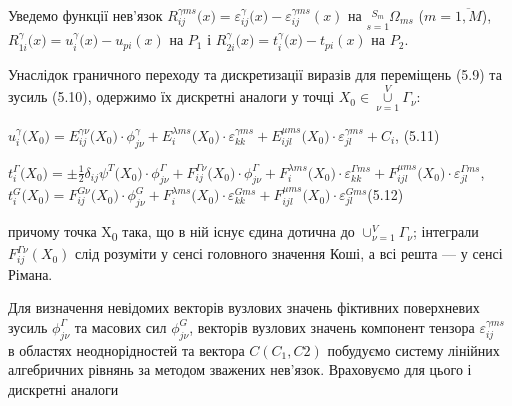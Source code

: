 Уведемо функції нев'язок
$R_{\mathit{\text{ij}}}^{\gamma\mathit{\text{ms}}}(x{) = \varepsilon_{\mathit{\text{ij}}}^{\gamma}}(x{) - \varepsilon_{\mathit{\text{ij}}}^{\gamma\mathit{\text{ms}}}}(x)$
на $\underset{s = 1}{\overset{S_{m}}{}}\Omega_{\mathit{\text{ms}}}$ ($m = \overline{1,M}$), $R_{1i}^{\gamma}(x{) =
u_{i}^{\gamma}}(x{) - u_{\mathit{\text{pi}}}}(x)$ на $P_1$ і $R_{2i}^{\gamma}(x{) = t_{i}^{\gamma}}(x{) -
t_{\mathit{\text{pi}}}}(x)$ на $P_2$.

Унаслідок граничного переходу та дискретизації виразів для переміщень (5.9) та зусиль (5.10), одержимо їх дискретні
аналоги у точці $X_{0}{\in\underset{\nu = 1}{\overset{V}{\cup}}\Gamma_{\nu}}$:

$u_{i}^{\gamma}(X_{0}{) = E_{\mathit{\text{ij}}}^{\gamma \nu}}(X_{0}{{) \cdot \phi_{\mathit{j\nu}}^{\gamma}} + E_{i}^{\lambda\mathit{\text{ms}}}}(X_{0}{{) \cdot \varepsilon_{\mathit{\text{kk}}}^{\gamma\mathit{\text{ms}}}} + E_{\mathit{\text{ijl}}}^{\mu\mathit{\text{ms}}}}(X_{0}{{) \cdot \varepsilon_{\mathit{\text{jl}}}^{\gamma\mathit{\text{ms}}}} + C_{i}}$,
(5.11)

$t_{i}^{\Gamma}(X_{0}{) = {\pm \frac{1}{2}}}\delta_{\mathit{\text{ij}}}\psi^{T}(X_{0}{{) \cdot \phi_{\mathit{j\nu}}^{\Gamma}} + F_{\mathit{\text{ij}}}^{\mathit{\Gamma\nu}}}(X_{0}{{) \cdot \phi_{\mathit{j\nu}}^{\Gamma}} + F_{i}^{\lambda\mathit{\text{ms}}}}(X_{0}{{) \cdot \varepsilon_{\mathit{\text{kk}}}^{\Gamma\mathit{\text{ms}}}} + F_{\mathit{\text{ijl}}}^{\mu\mathit{\text{ms}}}}(X_{0}{) \cdot \varepsilon_{\mathit{\text{jl}}}^{\Gamma\mathit{\text{ms}}}}$,
$t_{i}^{G}(X_{0}{) = F_{\mathit{\text{ij}}}^{\mathit{G\nu}}}(X_{0}{{) \cdot \phi_{\mathit{j\nu}}^{G}} + F_{i}^{\lambda\mathit{\text{ms}}}}(X_{0}{{) \cdot \varepsilon_{\mathit{\text{kk}}}^{\mathit{\text{Gms}}}} + F_{\mathit{\text{ijl}}}^{\mu\mathit{\text{ms}}}}(X_{0}{) \cdot \varepsilon_{\mathit{\text{jl}}}^{\mathit{\text{Gms}}}}$(5.12)

\noindent причому точка X\textsubscript{0} така, що в ній існує єдина дотична до $\cup_{\nu = 1}^{V}\Gamma_{\nu}$;
інтеграли $F_{\mathit{\text{ij}}}^{\mathit{\Gamma\nu}}(X_{0})$ слід розуміти у сенсі головного значення Коші, а всі
решта --- у сенсі Рімана.

Для визначення невідомих векторів вузлових значень фіктивних поверхневих зусиль $\phi_{j\nu}^\Gamma$ та масових сил
$\phi_{j\nu}^G$, векторів вузлових значень компонент тензора $\varepsilon_{ij}^{\gamma ms}$ в областях неоднорідностей
та вектора $C(C_1, C2)$ побудуємо систему лінійних алгебричних рівнянь за методом зважених нев'язок. Враховуємо для
цього і дискретні аналоги

